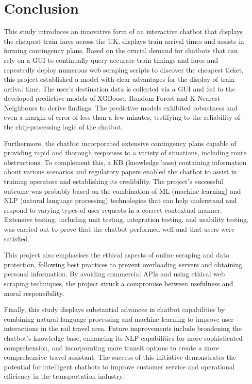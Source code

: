 \section{Conclusion}
This study introduces an innovative form of an interactive chatbot that displays the cheapest train fares across the UK, displays train arrival times and assists in forming contingency plans. Based on the crucial demand for chatbots that can rely on a GUI to continually query accurate train timings and fares and repeatedly deploy numerous web scraping scripts to discover the cheapest ticket, this project established a model with clear advantages for the display of train arrival time. The user’s destination data is collected via a GUI and fed to the developed predictive models of XGBoost, Random Forest and K-Nearest Neighbours to derive findings. The predictive models exhibited robustness and even a margin of error of less than a few minutes, testifying to the reliability of the chip-processing logic of the chatbot. %

\noindent
Furthermore, the chatbot incorporated extensive contingency plans capable of providing rapid and thorough responses to a variety of situations, including route obstructions. To complement this, a KB (knowledge base) containing information about various scenarios and regulatory papers enabled the chatbot to assist in training operators and establishing its credibility. The project's successful outcome was probably based on the combination of ML (machine learning) and NLP (natural language processing) technologies that can help understand and respond to varying types of user requests in a correct contextual manner. Extensive testing, including unit testing, integration testing, and usability testing, was carried out to prove that the chatbot performed well and that users were satisfied.\vspace{0.5cm}

\noindent
This project also emphasises the ethical aspects of online scraping and data protection, following best practices to prevent overloading servers and obtaining personal information. By avoiding commercial APIs and using ethical web scraping techniques, the project struck a compromise between usefulness and moral responsibility.\vspace{0.5cm}

\noindent
Finally, this study displays substantial advances in chatbot capabilities by combining natural language processing and machine learning to improve user interactions in the rail travel area. Future improvements include broadening the chatbot's knowledge base, enhancing its NLP capabilities for more sophisticated comprehension, and incorporating more transit options to create a more comprehensive travel assistant. The success of this initiative demonstrates the potential for intelligent chatbots to improve customer service and operational efficiency in the transportation industry.